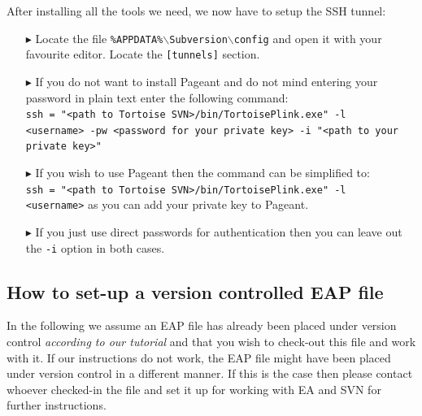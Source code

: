 After installing all the tools we need, we now have to setup the SSH tunnel:

\begin{enumerate}
  \item[$\blacktriangleright$] Locate the file \texttt{\%APPDATA\%$\backslash$Subversion$\backslash$config} and open it with your favourite editor. Locate the
  \texttt{[tunnels]} section.
  \item[$\blacktriangleright$] If you do not want to install Pageant and do not mind entering your password in plain text enter the following command:\\
  \texttt{ssh = "<path to Tortoise SVN>/bin/TortoisePlink.exe" -l \\<username> -pw <password for your private key> -i "<path to your private key>"}
  \item[$\blacktriangleright$] If you wish to use Pageant then the command can be simplified to:\\ \texttt{ssh = "<path to Tortoise SVN>/bin/TortoisePlink.exe"
  -l \\<username>} as you can add your private key to Pageant.
  \item[$\blacktriangleright$] If you just use direct passwords for authentication then you can leave out the \texttt{-i} option in both cases.
\end{enumerate}



\subsection{How to set-up a version controlled EAP file}

In the following we assume an EAP file has already been placed under version control \emph{according to our tutorial} and that you wish to check-out this file
and work with it. If our instructions do not work, the EAP file might have been placed under version control in a different manner. If this is the case then
please contact whoever checked-in the file and set it up for working with EA and SVN for further instructions.

